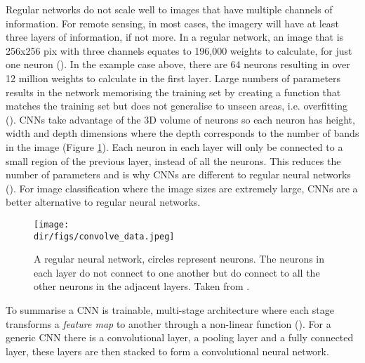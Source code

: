 Regular networks do not scale well to images that have multiple channels of information. For remote sensing, in most cases, the imagery will have at least three layers of information, if not more. In a regular network, an image that is 256x256 pix with three channels equates to 196,000 weights to calculate, for just one neuron (\cite{karpathy_cnn1}). In the example case above, there are 64 neurons resulting in over 12 million weights to calculate in the first layer. Large numbers of parameters results in the network memorising the training set by creating a function that matches the training set but does not generalise to unseen areas, i.e. overfitting (\cite{dietterich95}). CNNs take advantage of the 3D volume of neurons so each neuron has height, width and depth dimensions where the depth corresponds to the number of bands in the image (Figure \ref{fig.convolve_data}). Each neuron in each layer will only be connected to a small region of the previous layer, instead of all the neurons. This reduces the number of parameters and is why CNNs are different to regular neural networks (\cite{karpathy_cnn1}). For image classification where the image sizes are extremely large, CNNs are a better alternative to regular neural networks.
\begin{figure}[htbp]
    \centering
    \texttt{[image: \\dir/figs/convolve\_data.jpeg]}
    \caption[Basic Neural Network architecture]{A regular neural network, circles represent neurons. The neurons in each layer do not connect to one another but do connect to all the other neurons in the adjacent layers. Taken from \citet{karpathy_cnn1}. }
    \label{fig.convolve_data}
\end{figure}
\par
To summarise a CNN is trainable, multi-stage architecture where each stage transforms a \textit{feature map} to another through a non-linear function (\cite{lecun10}). For a generic CNN there is a convolutional layer, a pooling layer and a fully connected layer, these layers are then stacked to form a convolutional neural network.


